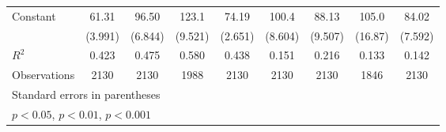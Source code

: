 \documentclass{article}
\begin{document}
{\begin{longtable}{l*{8}{c}}
Constant        &    61.31\sym{***}&    96.50\sym{***}&    123.1\sym{***}&    74.19\sym{***}&    100.4\sym{***}&    88.13\sym{***}&    105.0\sym{***}&    84.02\sym{***}\\
                &  (3.991)         &  (6.844)         &  (9.521)         &  (2.651)         &  (8.604)         &  (9.507)         &  (16.87)         &  (7.592)         \\
\hline
\(R^{2}\)       &    0.423         &    0.475         &    0.580         &    0.438         &    0.151         &    0.216         &    0.133         &    0.142         \\
Observations    &     2130         &     2130         &     1988         &     2130         &     2130         &     2130         &     1846         &     2130         \\
\hline\hline
\multicolumn{9}{l}{\footnotesize Standard errors in parentheses}\\
\multicolumn{9}{l}{\footnotesize \sym{*} \(p<0.05\), \sym{**} \(p<0.01\), \sym{***} \(p<0.001\)}\\
\end{longtable}
}
\end{document}
